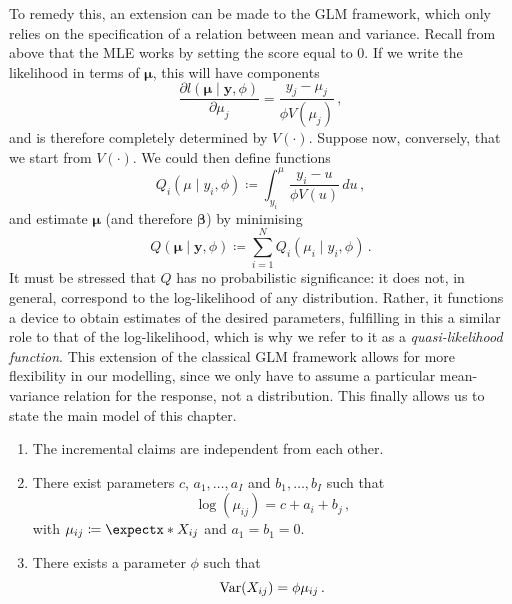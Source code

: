 \documentclass[a4paper]{book}
\begin{document}
To remedy this, an extension can be made to the GLM framework, which only relies on the specification of a relation between mean and variance. Recall from above that the MLE works by setting the score equal to $0$. If we write the likelihood in terms of $\bm{\mu}$, this will have components
\begin{equation} \label{eq:lhood-mean-param}
  \frac{\partial l(\bm{\mu} \mid \mathbf{y}, \phi)}{\partial \mu_j} = \frac{y_j - \mu_j}{\phi V(\mu_j)} \,,
\end{equation}
and is therefore completely determined by $V(\cdot)$. Suppose now, conversely, that we start from $V(\cdot)$. We could then define functions
\begin{equation}
  Q_i(\mu \mid y_i, \phi) \coloneqq \int_{y_i}^{\mu} \frac{y_i - u}{\phi V(u)} \, du \,,
\end{equation}
and estimate $\bm{\mu}$ (and therefore $\bm{\beta}$) by minimising
\begin{equation}
  Q(\bm{\mu} \mid \mathbf{y}, \phi) \coloneqq \sum_{i = 1}^N Q_i(\mu_i \mid y_i, \phi) \,.
\end{equation}
It must be stressed that $Q$ has no probabilistic significance: it does not, in general, correspond to the log-likelihood of any distribution. Rather, it functions a device to obtain estimates of the desired parameters, fulfilling in this a similar role to that of the log-likelihood, which is why we refer to it as a \emph{quasi-likelihood function}. This extension of the classical GLM framework allows for more flexibility in our modelling, since we only have to assume a particular mean-variance relation for the response, not a distribution. This finally allows us to state the main model of this chapter.

\begin{model} \leavevmode \label{model:odp}
  \begin{enumerate}[label=\bf{\textup{(}ODP\arabic*\textup{)}},ref=\textup{(}ODP\arabic*\textup{)}, wide]
    \item The incremental claims are independent from each other.
    \item There exist parameters $c$, $a_1, \dots, a_I$ and $b_1, \dots, b_I$ such that
          \begin{equation}
            \log(\mu_{ij}) = c + a_i + b_j \,,
          \end{equation}
          with $\mu_{ij} \coloneqq \expect{X_{ij}}$ and $a_1 = b_1 = 0$.
    \item There exists a parameter $\phi$ such that
          \begin{equation}
            \var{X_{ij}} = \phi \mu_{ij} \,.
          \end{equation}
  \end{enumerate}
\end{model}
\end{document}
